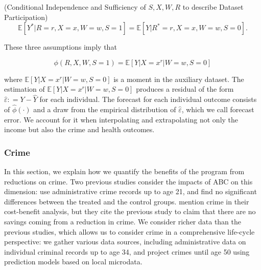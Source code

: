 \begin{assumption} (Conditional Independence and Sufficiency of $S, X, W, R$ to describe Dataset Participation)
\begin{equation}
\mathbb{E} \left[ Y^* | R = r, X = x, W = w, S = 1 \right] = \mathbb{E} \left[ Y | R^* = r , X = x, W = w, S = 0\right]. 
\end{equation}
\end{assumption}

\noindent These three assumptions imply that 

\begin{equation}
\phi \left( R, X, W, S = 1 \right) = \mathbb{E} \left[ Y | X = x^r | W = w, S = 0 \right]  
\end{equation}

\noindent where $\mathbb{E} \left[ Y | X = x^r | W = w, S = 0 \right]$ is a moment in the auxiliary dataset. The estimation of $\mathbb{E} \left[ Y | X = x^r | W = w, S = 0 \right]$ produces a residual of the form $\widehat{\varepsilon} : = Y - \widehat{Y}$ for each individual. The forecast for each  individual outcome consists of $\widehat{\phi} \left( \cdot \right)$ and a draw from the empirical distribution of $\widehat{\varepsilon}$, which we call forecast error. We account for it when interpolating and extrapolating not only the income but also the crime and health outcomes.

\subsubsection{Crime}  \label{sec:crime}

\noindent In this section, we explain how we quantify the benefits of the program from reductions on crime. Two previous studies consider the impacts of ABC on this dimension: \citet{Clarke_Campbell_1998_ABC_Comparison_ECRQ} use administrative crime records up to age 21, and find no significant differences between the treated and the control groups. \cite{Barnett_Masse_2007_EER} mention crime in their cost-benefit analysis, but they cite the previous study to claim that there are no savings coming from a reduction in crime. We consider richer data than the previous studies, which allows us to consider crime in a comprehensive life-cycle perspective: we gather various data sources, including administrative data on individual criminal records up to age 34, and project crimes until age 50 using prediction models based on local microdata. \\

